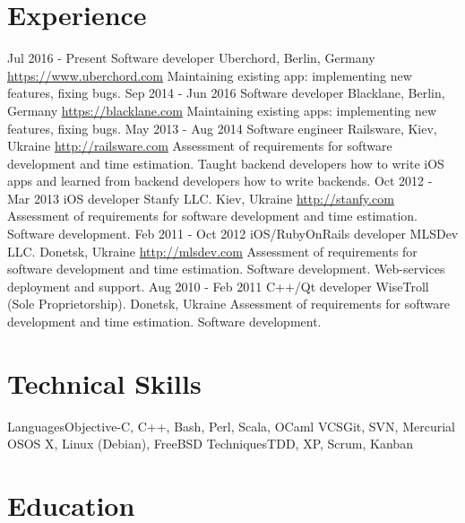 \documentclass[11pt,a4paper]{moderncv}
\begin{document}
\section{Experience}
\cventry
  {Jul 2016 - Present}
  {Software developer}
  {Uberchord, Berlin, Germany}
  {\newline{}\url{https://www.uberchord.com}}{}
  {Maintaining existing app: implementing new features, fixing bugs.}
\cventry
  {Sep 2014 - Jun 2016}
  {Software developer}
  {Blacklane, Berlin, Germany}
  {\newline{}\url{https://blacklane.com}}{}
  {Maintaining existing apps: implementing new features, fixing bugs.}
\cventry
  {May 2013 - Aug 2014}
  {Software engineer}
  {Railsware, Kiev, Ukraine}
  {\newline{}\url{http://railsware.com}}{}
  {Assessment of requirements for software development and time estimation.\newline{}
  Taught backend developers how to write iOS apps and learned from backend developers how to write backends.}
\cventry
  {Oct 2012 - Mar 2013}
  {iOS developer}
  {Stanfy LLC. Kiev, Ukraine}
  {\newline{}\url{http://stanfy.com}}{}
  {Assessment of requirements for software development and time estimation.
  \newline{}Software development.}
\cventry
  {Feb 2011 - Oct 2012}
  {iOS/RubyOnRails developer}
  {MLSDev LLC. Donetsk, Ukraine}
  {\newline{}\url{http://mlsdev.com}}{}
  {Assessment of requirements for software development and time estimation.\newline{}
  Software development. Web-services deployment and support.}
\cventry
  {Aug 2010 - Feb 2011}
  {C++/Qt developer}
  {WiseTroll (Sole Proprietorship). Donetsk, Ukraine}
  {}{}
  {Assessment of requirements for software development and time estimation.
  \newline{}Software development.}

\section{Technical Skills}
\cvline
  {Languages}{Objective-C, C++, Bash, Perl, Scala, OCaml}
\cvline
  {VCS}{Git, SVN, Mercurial}
\cvline
  {OS}{OS X, Linux (Debian), FreeBSD}
\cvline
  {Techniques}{TDD, XP, Scrum, Kanban}

\section{Education}
\end{document}
